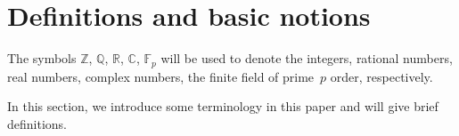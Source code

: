 \section{Definitions and basic notions}\label{section2}
 The symbols $\mathbb{Z}$, $\mathbb{Q}$, $\mathbb{R}$, $\mathbb{C}$, $\mathbb{F}_p$ will be used to denote the integers, rational numbers, real numbers, complex numbers, the finite field of prime~$p$ order, respectively.

 In this section, we introduce some terminology in this paper and will give brief definitions.
